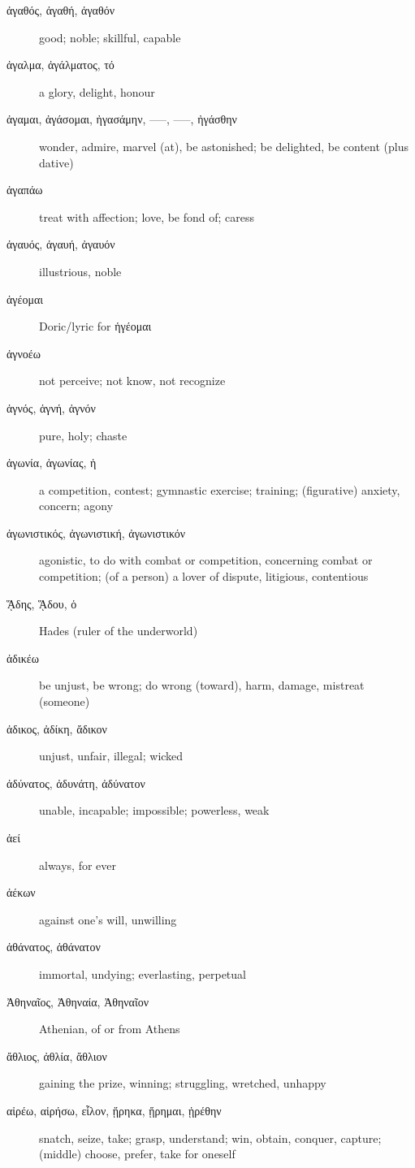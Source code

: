 \documentclass[12pt,letterpaper]{article}
\begin{document}
\begin{description}
    \item[\textgreek{ἀγαθός, ἀγαθή, ἀγαθόν}] \marginnote{*}good; noble; skillful, capable
    \item[\textgreek{ἀγαλμα, ἀγάλματος, τό}] a glory, delight, honour
    \item[\textgreek{ἀγαμαι, ἀγάσομαι, ἠγασάμην, –––, –––, ἠγάσθην}] wonder, admire, marvel (at), be astonished; be delighted, be content (plus dative)
    \item[\textgreek{ἀγαπάω}] treat with affection; love, be fond of; caress
    \item[\textgreek{ἀγαυός, ἀγαυή, ἀγαυόν}] illustrious, noble
    \item[\textgreek{ἁγέομαι}] Doric/lyric for \textgreek{ἡγέομαι}
    \item[\textgreek{ἀγνοέω}] not perceive; not know, not recognize
    \item[\textgreek{ἁγνός, ἁγνή, ἁγνόν}] pure, holy; chaste
    \item[\textgreek{ἀγωνία, ἀγωνίας, ἡ}] a competition, contest; gymnastic exercise; training; (figurative) anxiety, concern; agony
    \item[\textgreek{ἀγωνιστικός, ἀγωνιστική, ἀγωνιστικόν}] agonistic, to do with combat or competition, concerning combat or competition; (of a person) a lover of dispute, litigious, contentious
    \item[\textgreek{ᾍδης, ᾍδου, ὁ}] Hades (ruler of the underworld)
    \item[\textgreek{ἀδικέω}] \marginnote{*}be unjust, be wrong; do wrong (toward), harm, damage, mistreat (someone)
    \item[\textgreek{ἀδικος, ἀδίκη, ἄδικον}] unjust, unfair, illegal; wicked
    \item[\textgreek{ἀδύνατος, ἀδυνάτη, ἀδύνατον}] \marginnote{*}unable, incapable; impossible; powerless, weak
    \item[\textgreek{ἀεί}] \marginnote{*}always, for ever
    \item[\textgreek{ἀέκων}] against one's will, unwilling
    \item[\textgreek{ἀθάνατος, ἀθάνατον}] immortal, undying; everlasting, perpetual
    \item[\textgreek{Ἀθηναῖος, Ἀθηναία, Ἀθηναῖον}] Athenian, of or from Athens
    \item[\textgreek{ἄθλιος, ἀθλία, ἄθλιον}] gaining the prize, winning; struggling, wretched, unhappy
    \item[\textgreek{αἱρέω, αἱρήσω, εἷλον, ᾕρηκα, ᾕρημαι, ᾑρέθην}] \marginnote{*}snatch, seize, take; grasp, understand; win, obtain, conquer, capture; (middle) choose, prefer, take for oneself

\end{description}
\end{document}
